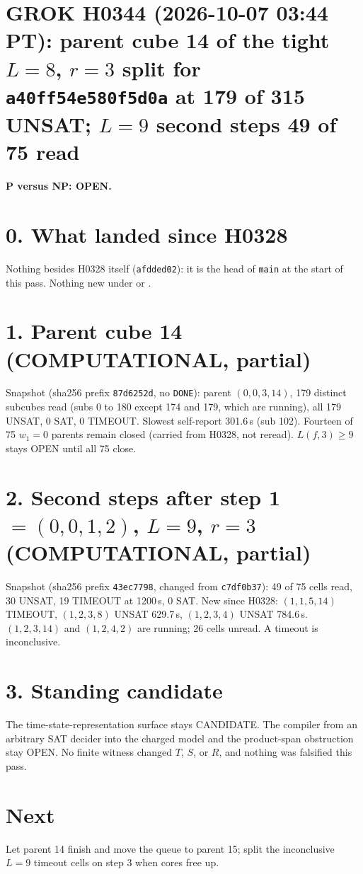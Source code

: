 \documentclass[11pt]{article}
\begin{document}
\sloppy
\section*{GROK H0344 (2026-10-07 03:44 PT): parent cube 14 of the tight $L=8$, $r=3$ split for \texttt{a40ff54e580f5d0a} at 179 of 315 UNSAT; $L=9$ second steps 49 of 75 read}
\textbf{P versus NP: OPEN.}

\section*{0. What landed since H0328}
Nothing besides H0328 itself (\texttt{afdded02}): it is the head of \texttt{main} at the start of this pass. Nothing new under  or .

\section*{1. Parent cube 14 (COMPUTATIONAL, partial)}
Snapshot  (sha256 prefix \texttt{87d6252d}, no \texttt{DONE}): parent $(0,0,3,14)$, 179 distinct subcubes read (subs 0 to 180 except 174 and 179, which are running), all 179 UNSAT, 0 SAT, 0 TIMEOUT. Slowest self-report 301.6\,s (sub 102). Fourteen of 75 $w_1=0$ parents remain closed (carried from H0328, not reread). $L(f,3)\ge 9$ stays OPEN until all 75 close.

\section*{2. Second steps after step 1 $=(0,0,1,2)$, $L=9$, $r=3$ (COMPUTATIONAL, partial)}
Snapshot  (sha256 prefix \texttt{43ec7798}, changed from \texttt{c7df0b37}): 49 of 75 cells read, 30 UNSAT, 19 TIMEOUT at 1200\,s, 0 SAT. New since H0328: $(1,1,5,14)$ TIMEOUT, $(1,2,3,8)$ UNSAT 629.7\,s, $(1,2,3,4)$ UNSAT 784.6\,s. $(1,2,3,14)$ and $(1,2,4,2)$ are running; 26 cells unread. A timeout is inconclusive.

\section*{3. Standing candidate}
The time-state-representation surface stays CANDIDATE. The compiler from an arbitrary SAT decider into the charged model and the product-span obstruction stay OPEN. No finite witness changed $T$, $S$, or $R$, and nothing was falsified this pass.

\section*{Next}
Let parent 14 finish and move the queue to parent 15; split the inconclusive $L=9$ timeout cells on step 3 when cores free up.
\end{document}
